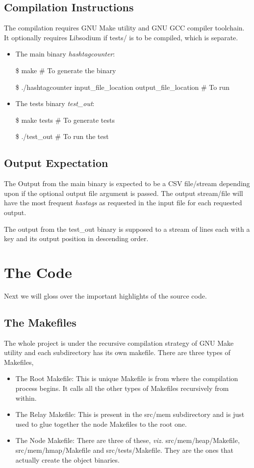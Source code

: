 \documentclass[conference,a4paper,12pt]{IEEEtran}
\begin{document}
	\subsection{Compilation Instructions}
	The compilation requires GNU Make utility and GNU GCC compiler toolchain. It optionally requires Libsodium if tests/ is to be compiled, which is separate.
	\begin{itemize}
	\item{The main binary \textit{hashtagcounter}:}
	
		\$ make			\# To generate the binary
		
		\$ ./hashtagcounter input\_file\_location output\_file\_location		\# To run
		
	\item{The tests binary \textit{test\_out}:}
		
		\$ make tests		\# To generate tests
		
		\$ ./test\_out		\# To run the test
		
	\end{itemize}
	
	\subsection{Output Expectation}
	The Output from the main binary is expected to be a CSV file/stream depending upon if the optional output file argument is passed. The output stream/file will have the most frequent \textit{hastags} as requested in the input file for each requested output.
	
	The output from the test\_out binary is supposed to a stream of lines each with a key and its output position in descending order.
	
\section{The Code}
	Next we will gloss over the important highlights of the source code.
	\subsection{The Makefiles}
		The whole project is under the recursive compilation strategy of GNU Make utility and each subdirectory has its own makefile. There are three types of Makefiles,
		\begin{itemize}
		\item{The Root Makefile:}
		This is unique Makefile is from where the compilation process begins. It calls all the other types of Makefiles recursively from within.
		\item{The Relay Makefile:}
		This is present in the src/mem subdirectory and is just used to glue together the node Makefiles to the root one.
		\item{The Node Makefile:}
		There are three of these, \textit{viz.} src/mem/heap/Makefile, src/mem/hmap/Makefile and src/tests/Makefile. They are the ones that actually create the object binaries.
		\end{itemize}
\end{document}
